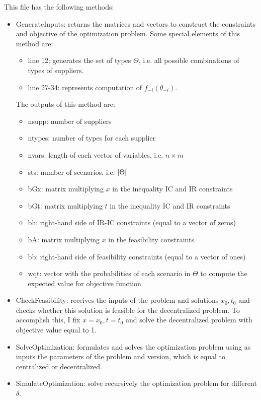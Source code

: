 \documentclass[11pt, oneside]{article}
\begin{document}
This file has the following methods:
\begin{itemize}
    \item GenerateInputs: returns the matrices and vectors to construct the
    constraints and objective of the optimization problem. Some special elements
    of this method are:
    \begin{itemize}
        \item line 12: generates the set of types \(\Theta\), i.e. all possible
        combinations of types of suppliers.
        \item line 27-34: represents computation of \(f_{-i}(\theta_{-i})\).
    \end{itemize}
    The outputs of this method are:
    \begin{itemize}
        \item nsupp: number of suppliers
        \item ntypes: number of types for each supplier
        \item nvars: length of each vector of variables, i.e. \(n\times m\)
        \item sts: number of scenarios, i.e. \(\left|\Theta\right|\)
        \item bGx: matrix multiplying \(x\) in the inequality IC and IR constraints
        \item bGt: matrix multiplying \(t\) in the inequality IC and IR constraints
        \item bh: right-hand side of IR-IC constraints (equal to a vector of zeros)
        \item bA: matrix multiplying \(x\) in the feasibility constraints
        \item bb: right-hand side of feasibility constraints (equal to a vector of ones)
        \item wqt: vector with the probabilities of each scenario in \(\Theta\) to compute the expected value for objective function
    \end{itemize}
    \item CheckFeasibility: receives the inputs of the problem and solutions
    \(x_0, t_0\) and checks whether this solution is feasible for the decentralized problem. To accomplish this, I fix \(x=x_0, t=t_0\) and solve the decentralized problem with objective value equal to 1.
    \item SolveOptimization: formulates and solves the optimization problem using as inputs the parameters of the problem and version, which is equal to centralized or decentralized.
    \item SimulateOptimization: solve recursively the optimization problem for different \(\delta\).
\end{itemize}
\end{document}
